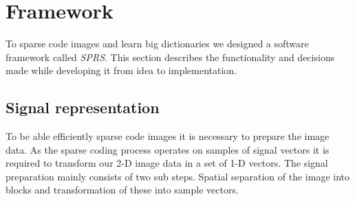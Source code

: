 
\chapter{Framework}
To sparse code images and learn big dictionaries we designed a software
framework called \emph{SPRS}. This section describes the functionality and
decisions made while developing it from idea to implementation.

\section{Signal representation}
\label{sec:signal_representation}
To be able efficiently sparse code images it is necessary to prepare the
image data. As the sparse coding process operates on samples of signal
vectors it is required to transform our 2-D image data in a set of 1-D vectors.
The signal preparation mainly consists of two sub steps. Spatial separation of
the image into blocks and transformation of these into sample vectors.

